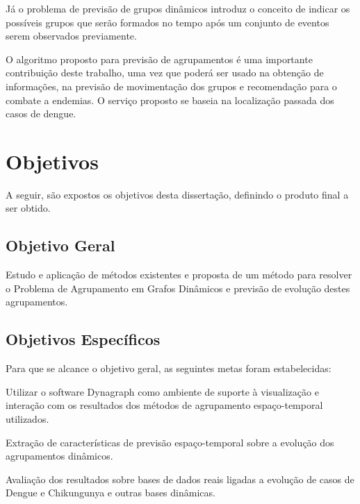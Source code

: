 Já o problema de previsão de grupos dinâmicos introduz o conceito de indicar os
possíveis grupos que serão formados no tempo após um conjunto de eventos serem
observados previamente.

O algoritmo proposto para previsão de agrupamentos é uma importante contribuição
deste trabalho, uma vez que poderá ser usado na obtenção de informações, na previsão de movimentação dos grupos e recomendação para o combate a endemias. O serviço proposto se baseia na localização passada dos casos de dengue.



\section{Objetivos}
\label{sec:objetivos}
A seguir, são expostos os objetivos desta dissertação, definindo o produto
final a ser obtido.

\subsection{Objetivo Geral}

Estudo e aplicação de métodos existentes e proposta de um método para resolver o Problema de Agrupamento
em Grafos Dinâmicos e previsão de evolução destes agrupamentos.

\subsection{Objetivos Específicos}
\label{sec:objetivos-especificos}

Para que se alcance o objetivo geral, as seguintes metas foram estabelecidas:

\begin{alineas}
	\item Utilizar o software Dynagraph como ambiente de suporte à visualização e interação com os resultados dos métodos de agrupamento espaço-temporal utilizados.
	\item Extração de características de previsão espaço-temporal sobre a evolução dos agrupamentos dinâmicos.
	\item Avaliação dos resultados sobre bases de dados reais ligadas a evolução de casos de Dengue e Chikungunya e outras bases dinâmicas.
\end{alineas}

